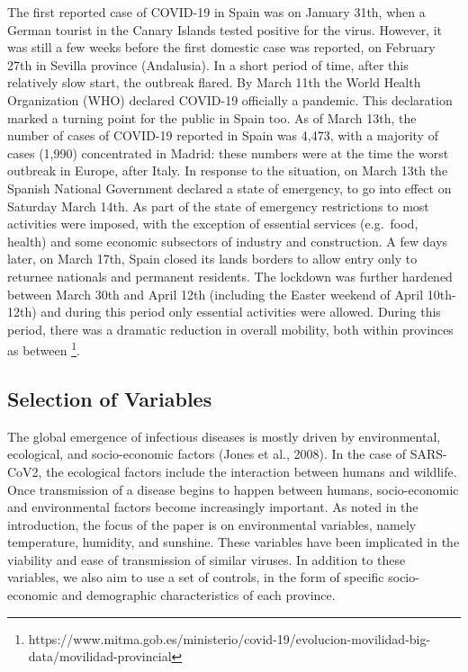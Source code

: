 \documentclass[]{elsarticle} %
\begin{document}
The first reported case of COVID-19 in Spain was on January 31th, when a
German tourist in the Canary Islands tested positive for the virus.
However, it was still a few weeks before the first domestic case was
reported, on February 27th in Sevilla province (Andalusia). In a short
period of time, after this relatively slow start, the outbreak flared.
By March 11th the World Health Organization (WHO) declared COVID-19
officially a pandemic. This declaration marked a turning point for the
public in Spain too. As of March 13th, the number of cases of COVID-19
reported in Spain was 4,473, with a majority of cases (1,990)
concentrated in Madrid: these numbers were at the time the worst
outbreak in Europe, after Italy. In response to the situation, on March
13th the Spanish National Government declared a state of emergency, to
go into effect on Saturday March 14th. As part of the state of emergency
restrictions to most activities were imposed, with the exception of
essential services (e.g.~food, health) and some economic subsectors of
industry and construction. A few days later, on March 17th, Spain closed
its lands borders to allow entry only to returnee nationals and
permanent residents. The lockdown was further hardened between March
30th and April 12th (including the Easter weekend of April 10th-12th)
and during this period only essential activities were allowed. During
this period, there was a dramatic reduction in overall mobility, both
within provinces as between
\footnote{https://www.mitma.gob.es/ministerio/covid-19/evolucion-movilidad-big-data/movilidad-provincial}.

\hypertarget{selection-of-variables}{%
\subsection{Selection of Variables}\label{selection-of-variables}}

The global emergence of infectious diseases is mostly driven by
environmental, ecological, and socio-economic factors (Jones et al.,
2008). In the case of SARS-CoV2, the ecological factors include the
interaction between humans and wildlife. Once transmission of a disease
begins to happen between humans, socio-economic and environmental
factors become increasingly important. As noted in the introduction, the
focus of the paper is on environmental variables, namely temperature,
humidity, and sunshine. These variables have been implicated in the
viability and ease of transmission of similar viruses. In addition to
these variables, we also aim to use a set of controls, in the form of
specific socio-economic and demographic characteristics of each
province.
\end{document}
